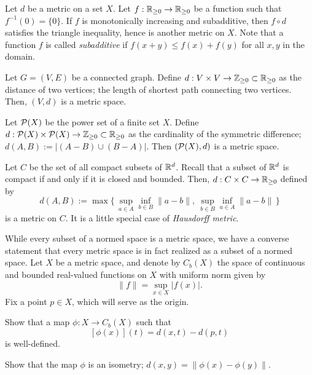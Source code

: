\documentclass{../../large}
\begin{document}
\begin{prb}
\begin{parts}
\item
Let $d$ be a metric on a set $X$.
Let $f:\mathbb{R}_{\ge0}\to\mathbb{R}_{\ge0}$ be a function such that $f^{-1}(0)=\{0\}$.
If $f$ is monotonically increasing and subadditive, then $f\circ d$ satisfies the triangle inequality, hence is another metric on $X$.
Note that a function $f$ is called \emph{subadditive} if $f(x+y)\le f(x)+f(y)$ for all $x,y$ in the domain.
\item
Let $G=(V,E)$ be a connected graph.
Define $d:V\times V\to\mathbb{Z}_{\ge0}\subset\mathbb{R}_{\ge0}$ as the distance of two vertices; the length of shortest path connecting two vertices.
Then, $(V,d)$ is a metric space.
\item
Let $\mathcal{P}(X)$ be the power set of a finite set $X$.
Define $d:\mathcal{P}(X)\times\mathcal{P}(X)\to\mathbb{Z}_{\ge0}\subset\mathbb{R}_{\ge0}$ as the cardinality of the symmetric difference; $d(A,B):=|(A-B)\cup(B-A)|$.
Then $(\mathcal{P}(X),d)$ is a metric space.
\item
Let $C$ be the set of all compact subsets of $\mathbb{R}^d$.
Recall that a subset of $\mathbb{R}^d$ is compact if and only if it is closed and bounded.
Then, $d:C\times C\to\mathbb{R}_{\ge0}$ defined by
\[d(A,B):=\max\{\,\sup_{a\in A}\inf_{b\in B}\|a-b\|,\ \sup_{b\in B}\inf_{a\in A}\|a-b\|\,\}\]
is a metric on $C$.
It is a little special case of \emph{Hausdorff metric}.
\end{parts}
\end{prb}


\begin{prb}
While every subset of a normed space is a metric space, we have a converse statement that every metric space is in fact realized as a subset of a normed space.
Let $X$ be a metric space, and denote by $C_b(X)$ the space of continuous and bounded real-valued functions on $X$ with uniform norm given by
\[\|f\|=\sup_{x\in X}|f(x)|.\]
Fix a point $p\in X$, which will serve as the origin.
\begin{parts}
\item Show that a map $\phi:X\to C_b(X)$ such that
\[[\phi(x)](t)=d(x,t)-d(p,t)\]
is well-defined.
\item Show that the map $\phi$ is an isometry; $d(x,y)=\|\phi(x)-\phi(y)\|$.
\end{parts}
\end{prb}
\end{document}
